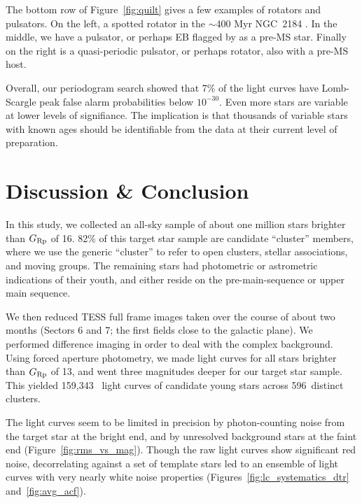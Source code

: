 \documentclass[12pt,twocolumn,tighten]{aastex62}
\newcommand{\numberlcs}{159{,}343\ } %
\newcommand{\numberclusters}{596\ } %
\begin{document}
The bottom row of Figure~\ref{fig:quilt} gives a few examples of
rotators and pulsators.  On the left, a spotted rotator in the
$\sim$400 Myr NGC~2184 \citep{cantat-gaudin_gaia_2018}.  In the
middle, we have a pulsator, or perhaps EB flagged by
\citet{zari_3d_2018} as a pre-MS star.  Finally on the right is a
quasi-periodic pulsator, or perhaps rotator, also with a pre-MS host.

Overall, our periodogram search showed that 7\% of the light curves
have Lomb-Scargle peak false alarm probabilities below $10^{-30}$.
Even more stars are variable at lower levels of signifiance.  The
implication is that thousands of variable stars with known ages should
be identifiable from the data at their current level of preparation.




\section{Discussion \& Conclusion}
\label{sec:conclusion}

In this study, we collected an all-sky sample of about one million
stars brighter than $G_{\rm Rp}$ of 16.  82\% of this target star
sample are candidate ``cluster'' members, where we use the generic
``cluster'' to refer to open clusters, stellar associations, and
moving groups.  The remaining stars had photometric or astrometric
indications of their youth, and either reside on the pre-main-sequence
or upper main sequence.

We then reduced TESS full frame images taken over the course of about
two months (Sectors 6 and 7; the first fields close to the galactic
plane).  We performed difference imaging in order to deal with the
complex background.  Using forced aperture photometry, we made light
curves for all stars brighter than $G_{\rm Rp}$ of 13, and went three
magnitudes deeper for our target star sample.  This yielded \numberlcs
light curves of candidate young stars across \numberclusters distinct
clusters.

The light curves seem to be limited in precision by photon-counting
noise from the target star at the bright end, and by unresolved
background stars at the faint end (Figure~\ref{fig:rms_vs_mag}).
Though the raw light curves show significant red noise, decorrelating
against a set of template stars led to an ensemble of light curves
with very nearly white noise properties
(Figures~\ref{fig:lc_systematics_dtr} and~\ref{fig:avg_acf}).
\end{document}
